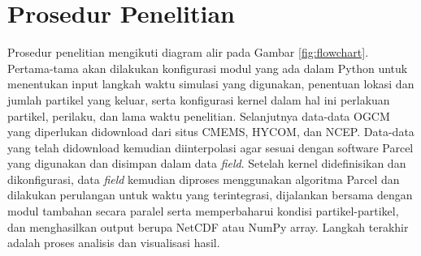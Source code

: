 \section[Prosedur Penelitian]{Prosedur Penelitian}
\begin{spacing}{1.5}
	Prosedur penelitian mengikuti diagram alir pada Gambar \ref{fig:flowchart}. Pertama-tama akan dilakukan konfigurasi modul yang ada dalam Python untuk menentukan input langkah waktu simulasi yang digunakan, penentuan lokasi dan  jumlah partikel yang keluar, serta konfigurasi kernel dalam hal ini perlakuan partikel, perilaku, dan lama waktu penelitian. Selanjutnya data-data OGCM yang diperlukan didownload dari situs CMEMS, HYCOM, dan NCEP. Data-data yang telah didownload kemudian diinterpolasi agar sesuai dengan software Parcel yang digunakan dan disimpan dalam data \textit{field}. Setelah kernel didefinisikan dan dikonfigurasi, data \textit{field} kemudian diproses menggunakan algoritma Parcel dan dilakukan perulangan untuk waktu yang terintegrasi, dijalankan bersama dengan modul tambahan secara paralel serta memperbaharui kondisi partikel-partikel, dan menghasilkan output berupa NetCDF atau NumPy array. Langkah terakhir adalah proses analisis dan visualisasi hasil.
\end{spacing}